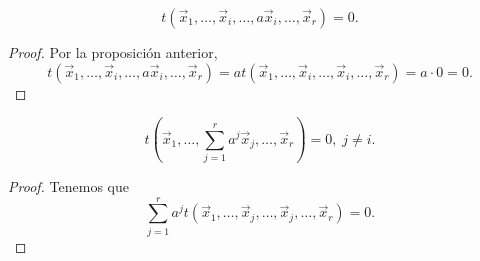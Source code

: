\begin{fprop}[]
\normalfont 
\[t\left(\vec{x}_{1}, \ldots, \vec{x}_{i}, \ldots, a\vec{x}_{i}, \ldots, \vec{x}_{r}\right) =0 .\]
\end{fprop}
\begin{proof}
Por la proposición anterior,
\[t\left(\vec{x}_{1}, \ldots, \vec{x}_{i}, \ldots, a\vec{x}_{i}, \ldots, \vec{x}_{r}\right) = at\left(\vec{x}_{1}, \ldots, \vec{x}_{i}, \ldots, \vec{x}_{i}, \ldots, \vec{x}_{r}\right) = a \cdot 0 = 0 .\]
\end{proof}

\begin{fprop}[]
\normalfont 
\[t\left(\vec{x}_{1}, \ldots, \sum^{r}_{j=1}a^{j}\vec{x}_{j}, \ldots, \vec{x}_{r}\right) = 0, \; j \neq i .\]
\end{fprop}
\begin{proof}
Tenemos que
\[\sum^{r}_{j=1}a^{j}t\left(\vec{x}_{1}, \ldots, \vec{x}_{j}, \ldots, \vec{x}_{j}, \ldots, \vec{x}_{r}\right) = 0 .\]
\end{proof}

